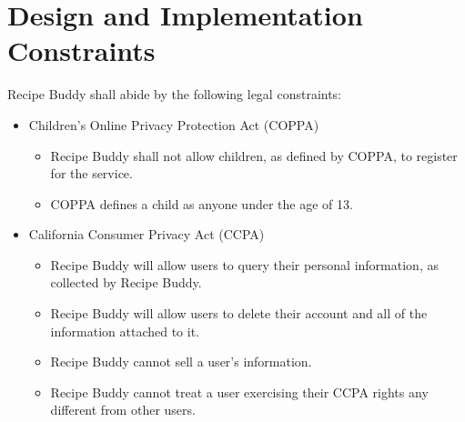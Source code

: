 \documentclass{scrreprt}
\begin{document}
\section{Design and Implementation Constraints}
\gls{Recipe Buddy} shall abide by the following legal constraints:
\begin{itemize}
    \item Children's Online Privacy Protection Act (\gls{COPPA})
    \begin{itemize}
        \item \gls{Recipe Buddy} shall not allow children, as defined by \gls{COPPA}, to register for the service.
        \item \gls{COPPA} defines a child as anyone under the age of 13.
    \end{itemize}
    \item California Consumer Privacy Act (\gls{CCPA})
    \begin{itemize}
        \item \gls{Recipe Buddy} will allow users to query their personal information, as collected by \gls{Recipe Buddy}.
        \item \gls{Recipe Buddy} will allow users to delete their account and all of the information attached to it.
        \item \gls{Recipe Buddy} cannot sell a user's information.
        \item \gls{Recipe Buddy} cannot treat a user exercising their \gls{CCPA} rights any different from other users.
    \end{itemize}
\end{itemize}  
\end{document}
